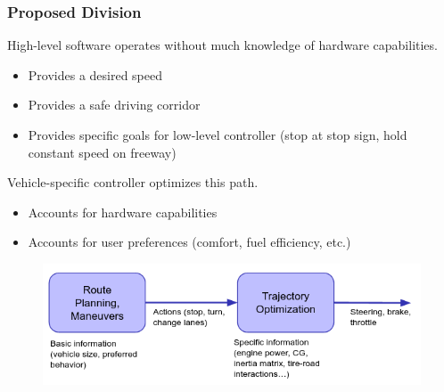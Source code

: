 \documentclass{beamer}
\begin{document}
	
	

\begin{frame}
\frametitle{Proposed Division}
High-level software operates without much knowledge of hardware capabilities.
\begin{itemize}
\item Provides a desired speed
\item Provides a safe driving corridor
\item Provides specific goals for low-level controller (stop at stop sign, hold constant speed on freeway)
\end{itemize}

Vehicle-specific controller optimizes this path.
\begin{itemize}
\item Accounts for hardware capabilities
\item Accounts for user preferences (comfort, fuel efficiency, etc.)
\end{itemize}
\vspace{-0.5em}
\begin{figure}
\includegraphics[width=0.8\linewidth]{figures/division.png}
\end{figure}
\end{frame}
\end{document}
